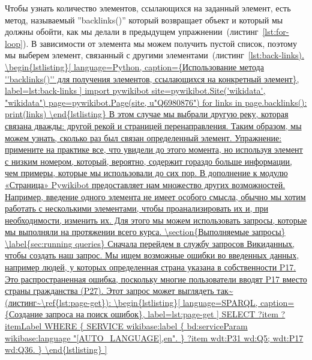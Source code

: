 Чтобы узнать количество элементов, ссылающихся на заданный элемент, есть метод, называемый ''backlinks()'' который возвращает объект и который мы должны обойти, как мы делали в предыдущем упражнении~(листинг~\ref{lst:for-loop}). В зависимости от элемента мы можем получить пустой список, поэтому мы выберем элемент, связанный с другими элементами~(листинг~\ref{lst:back-links).

\begin{lstlisting}[ language=Python,
                    caption={Использование метода ''backlinks()'' для получения элементов, ссылающихся на конкретный элемент},
                    label=lst:back-links
                  ]
import pywikibot
site=pywikibot.Site('wikidata', "wikidata")
page=pywikibot.Page(site, u"Q6980876")
for links in page.backlinks():
  print(links)
\end{lstlisting}

В этом случае мы выбрали другую реку, которая связана дважды: другой рекой и страницей перенаправления. Таким образом, мы можем узнать, сколько раз был связан определенный элемент.

Упражнение: примените на практике все, что увидели до этого момента, но используя элемент с низким номером, который, вероятно, содержит гораздо больше информации, чем примеры, которые мы использовали до сих пор.

В дополнение к модулю «Страница» Pywikibot предоставляет нам множество других возможностей. Например, введение одного элемента не имеет особого смысла, обычно мы хотим работать с несколькими элементами, чтобы проанализировать их и, при необходимости, изменить их. Для этого мы можем использовать запросы, которые мы выполняли на протяжении всего курса.

\section{Выполняемые запросы}
\label{sec:running queries}

Сначала перейдем в службу запросов Викиданных, чтобы создать наш запрос. Мы ищем возможные ошибки во введенных данных, например людей, у которых определенная страна указана в собственности P17. Это распространенная ошибка, поскольку многие пользователи вводят P17 вместо страны гражданства (P27).

Этот запрос может выглядеть так~(листинг~\ref{lst:page-get}):

\begin{lstlisting}[ language=SPARQL,
                    caption={Создание запроса на поиск ошибок},
                    label=lst:page-get
                  ]
SELECT ?item ?itemLabel WHERE {
  SERVICE wikibase:label { bd:serviceParam wikibase:language 
  "[AUTO_LANGUAGE],en". }
  ?item wdt:P31 wd:Q5;
    wdt:P17 wd:Q36.
}
\end{lstlisting}       

}
